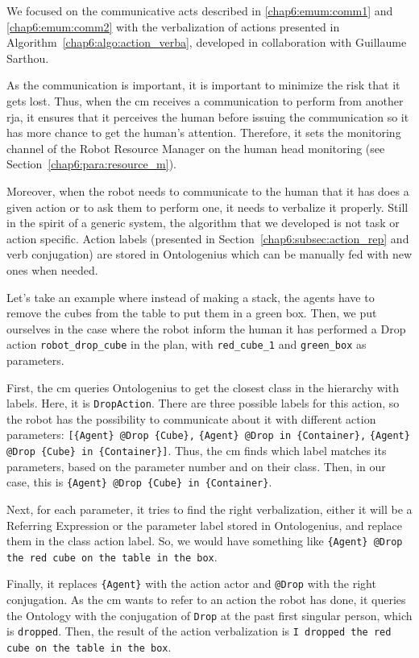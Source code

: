 \documentclass[a4paper,11pt,twoside]{StyleThese}
\begin{document}
We focused on the communicative acts described in \ref{chap6:emum:comm1} and \ref{chap6:emum:comm2} with the verbalization of actions presented in Algorithm~\ref{chap6:algo:action_verba}, developed in collaboration with Guillaume Sarthou. 

As the communication is important, it is important to minimize the risk that it gets lost. Thus, when the \acrshort{cm} receives a communication to perform from another \acrshort{rja}, it ensures that it perceives the human before issuing the communication so it has more chance to get the human's attention. Therefore, it sets the monitoring channel of the Robot Resource Manager on the human head monitoring (see Section~\ref{chap6:para:resource_m}).

Moreover, when the robot needs to communicate to the human that it has does a given action or to ask them to perform one, it needs to verbalize it properly. Still in the spirit of a generic system, the algorithm that we developed is not task or action specific. Action labels (presented in Section~\ref{chap6:subsec:action_rep} and verb conjugation) are stored in Ontologenius which can be manually fed with new ones when needed.

Let's take an example where instead of making a stack, the agents have to remove the cubes from the table to put them in a green box. Then, we put ourselves in the case where the robot inform the human it has performed a Drop action \verb'robot_drop_cube' in the plan, with \verb'red_cube_1' and \verb'green_box' as parameters. 

First, the \acrshort{cm} queries Ontologenius to get the closest class in the hierarchy with labels. Here, it is \verb'DropAction'. There are three possible labels for this action, so the robot has the possibility to communicate about it with different action parameters: \verb'[{Agent} @Drop {Cube},' \verb'{Agent} @Drop in {Container},' \verb'{Agent} @Drop {Cube} in {Container}]'. Thus, the \acrshort{cm} finds which label matches its parameters, based on the parameter number and on their class. Then, in our case, this is \verb'{Agent} @Drop {Cube} in {Container}'. 

Next, for each parameter, it tries to find the right verbalization, either it will be a Referring Expression or the parameter label stored in Ontologenius, and replace them in the class action label. So, we would have something like \verb'{Agent} @Drop the red cube on the table in the box'. 

Finally, it replaces \verb'{Agent}' with the action actor and \verb'@Drop' with the right conjugation. As the \acrshort{cm} wants to refer to an action the robot has done, it queries the Ontology with the conjugation of \verb'Drop' at the past first singular person, which is \verb'dropped'. Then, the result of the action verbalization is \verb'I dropped the red cube on the table in the box'. 
\end{document}
